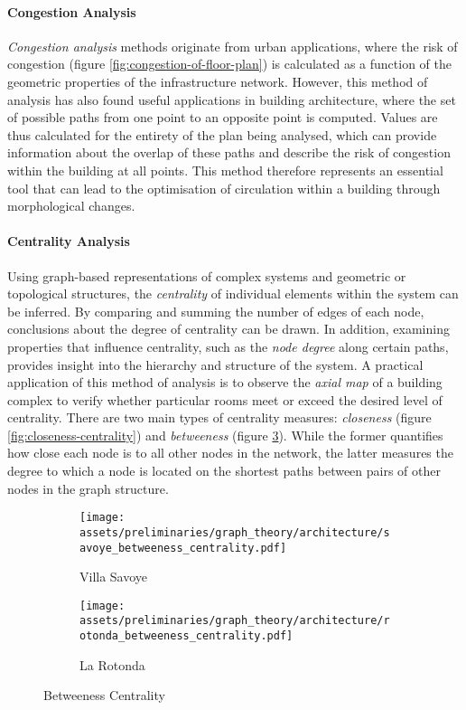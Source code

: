\documentclass[a4paper, 12pt]{report}
\begin{document}
\paragraph{Congestion Analysis}\label{par:congestion-analysis}

\textit{Congestion analysis} methods originate from urban applications, where the risk of congestion (figure \ref{fig:congestion-of-floor-plan}) is calculated as a function of the geometric properties of the infrastructure network. However, this method of analysis has also found useful applications in building architecture, where the set of possible paths from one point to an opposite point is computed. Values are thus calculated for the entirety of the plan being analysed, which can provide information about the overlap of these paths and describe the risk of congestion within the building at all points. This method therefore represents an essential tool that can lead to the optimisation of circulation within a building through morphological changes.

\paragraph{Centrality Analysis}\label{par:centrality-analysis}

Using graph-based representations of complex systems and geometric or topological structures, the \textit{\gls{centrality}} of individual elements within the system can be inferred. By comparing and summing the number of edges of each node, conclusions about the degree of \gls{centrality} can be drawn. In addition, examining properties that influence \gls{centrality}, such as the \textit{\gls{node degree}} along certain paths, provides insight into the hierarchy and structure of the system. A practical application of this method of analysis is to observe the \textit{\gls{axial map}} of a building complex to verify whether particular rooms meet or exceed the desired level of \gls{centrality}. There are two main types of \gls{centrality} measures: \textit{closeness} (figure \ref{fig:closeness-centrality}) and \textit{betweeness} (figure \ref{fig:betweeness-centrality}). While the former quantifies how close each node is to all other nodes in the network, the latter measures the degree to which a node is located on the shortest paths between pairs of other nodes in the graph structure.

\begin{figure}
\centering
\begin{subfigure}{.5\textwidth}
\centering
\texttt{[image: assets/preliminaries/graph\_theory/architecture/savoye\_betweeness\_centrality.pdf]}
\caption{Villa Savoye}
\label{fig:villa-savoye-1}
\end{subfigure}%
\begin{subfigure}{.5\textwidth}
\centering
\texttt{[image: assets/preliminaries/graph\_theory/architecture/rotonda\_betweeness\_centrality.pdf]}
\caption{La Rotonda}
\label{fig:la-rotonda-1}
\end{subfigure}
\caption{Betweeness Centrality}
\label{fig:betweeness-centrality}
\end{figure}
\end{document}
